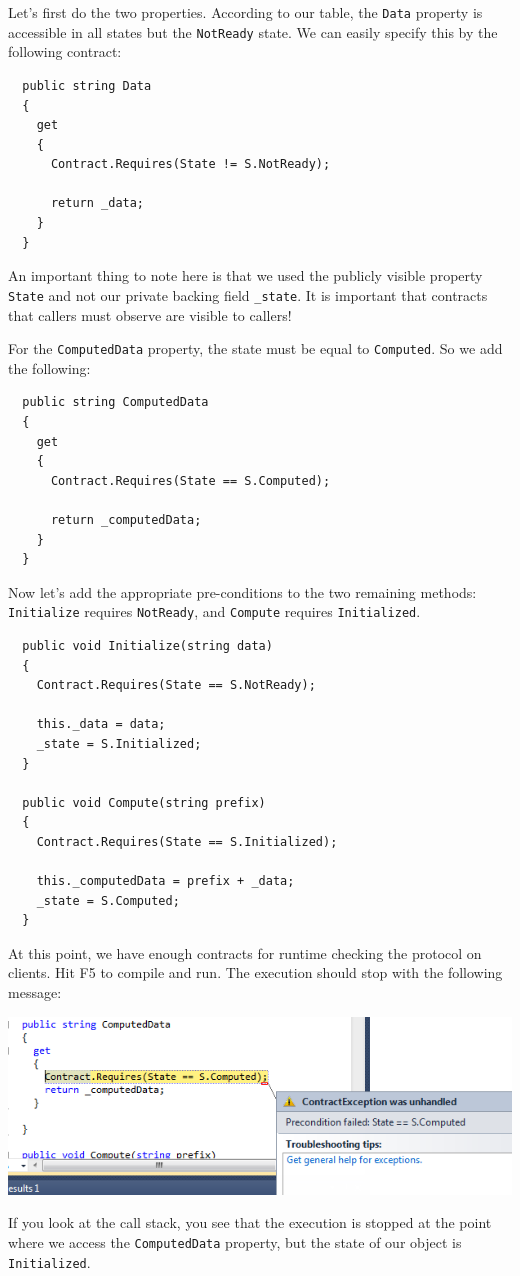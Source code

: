 \documentclass{article}
\newcommand{\code}[1]{\lstinline{#1}}
\begin{document}
Let's first do the two properties. According to our table, the
\code{Data} property is accessible in all states but the
\code{NotReady} state. We can easily specify this by the following
contract:
\begin{lstlisting}
  public string Data
  {
    get
    {
      Contract.Requires(State != S.NotReady);

      return _data;
    }
  }
\end{lstlisting}
An important thing to note here is that we used the publicly visible
property \code{State} and not our private backing field
\code{_state}. It is important that contracts that callers must
observe are visible to callers!

For the \code{ComputedData} property, the state must be equal to
\code{Computed}. So we add the following:
\begin{lstlisting}
  public string ComputedData
  {
    get
    {
      Contract.Requires(State == S.Computed);

      return _computedData;
    }
  }
\end{lstlisting}

Now let's add the appropriate pre-conditions to the two remaining
methods: \code{Initialize} requires \code{NotReady}, and
\code{Compute} requires \code{Initialized}.
\begin{lstlisting}
  public void Initialize(string data)
  {
    Contract.Requires(State == S.NotReady);

    this._data = data;
    _state = S.Initialized;
  }

  public void Compute(string prefix)
  {
    Contract.Requires(State == S.Initialized);

    this._computedData = prefix + _data;
    _state = S.Computed;
  }
\end{lstlisting}

At this point, we have enough contracts for runtime checking the
protocol on clients. Hit F5 to compile and run. The execution should
stop with the following message:
\begin{center}
  \includegraphics[width=.6\columnwidth]{assertion1.png}
\end{center}
If you look at the call stack, you see that the execution is stopped
at the point where we access the \code{ComputedData} property, but the
state of our object is \code{Initialized}.
\end{document}
